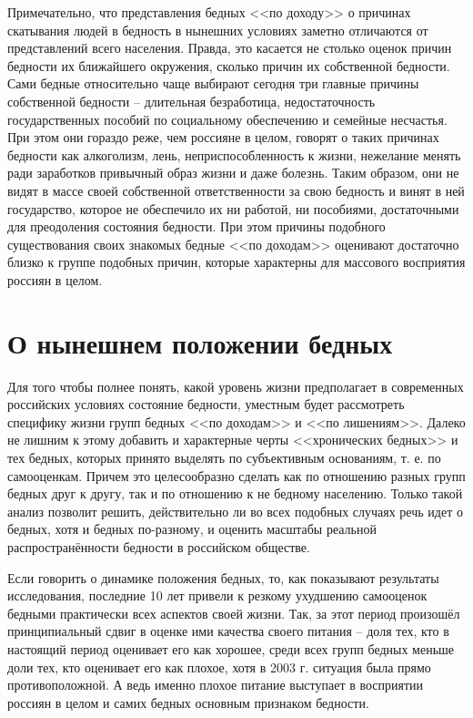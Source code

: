 Примечательно, что представления бедных <<по доходу>> о причинах скатывания 
людей в бедность в нынешних условиях заметно отличаются от представлений всего 
населения. Правда, это касается не столько оценок причин бедности их 
ближайшего окружения, сколько причин их собственной бедности. Сами бедные 
относительно чаще выбирают сегодня три главные причины собственной бедности -- 
длительная безработица, недостаточность государственных пособий по социальному 
обеспечению и семейные несчастья. При этом они гораздо реже, чем россияне в 
целом, говорят о таких причинах бедности как алкоголизм, лень, 
неприспособленность к жизни, нежелание менять ради заработков привычный образ 
жизни и даже болезнь. Таким образом, они не видят в массе своей собственной 
ответственности за свою бедность и винят в ней государство, которое не 
обеспечило их ни работой, ни пособиями, достаточными для преодоления состояния 
бедности. При этом причины подобного существования своих знакомых бедные 
<<по доходам>> оценивают достаточно близко к группе подобных причин, которые 
характерны для массового восприятия россиян в целом. \cite{vestnik}

\section{О нынешнем положении бедных}
Для того чтобы полнее понять, какой уровень жизни предполагает в современных 
российских условиях состояние бедности, уместным будет рассмотреть специфику 
жизни групп бедных <<по доходам>> и <<по лишениям>>. Далеко не лишним к этому 
добавить и характерные черты <<хронических бедных>> и тех бедных, которых 
принято выделять по субъективным основаниям, т. е. по самооценкам. Причем это 
целесообразно сделать как по отношению разных групп бедных друг к другу, так и 
по отношению к не бедному населению. Только такой анализ позволит решить, 
действительно ли во всех подобных случаях речь идет о бедных, хотя и бедных 
по-разному, и оценить масштабы реальной распространённости бедности в 
российском обществе.

Если говорить о динамике положения бедных, то, как показывают результаты 
исследования, последние 10 лет привели к резкому ухудшению самооценок бедными 
практически всех аспектов своей жизни. Так, за этот период произошёл 
принципиальный сдвиг в оценке ими качества своего питания -- доля тех, кто в 
настоящий период оценивает его как хорошее, среди всех групп бедных меньше 
доли тех, кто оценивает его как плохое, хотя в 2003 г. ситуация была прямо 
противоположной. А ведь именно плохое питание выступает в восприятии россиян 
в целом и самих бедных основным признаком бедности. 

